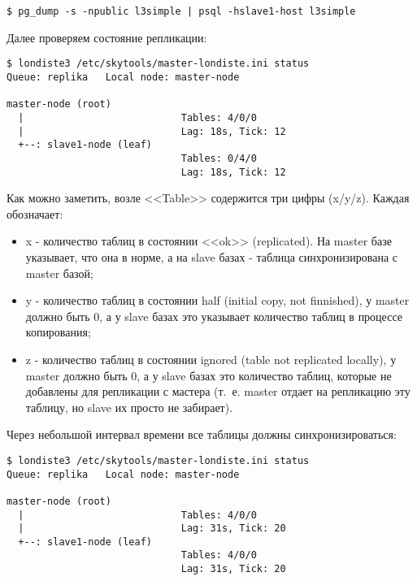 \begin{lstlisting}[label=lst:londiste-replica-dump1,caption=Клонирование структуры базы]
$ pg_dump -s -npublic l3simple | psql -hslave1-host l3simple
\end{lstlisting}

Далее проверяем состояние репликации:

\begin{lstlisting}[label=lst:londiste-replica15,caption=Статус кластера]
$ londiste3 /etc/skytools/master-londiste.ini status
Queue: replika   Local node: master-node

master-node (root)
  |                           Tables: 4/0/0
  |                           Lag: 18s, Tick: 12
  +--: slave1-node (leaf)
                              Tables: 0/4/0
                              Lag: 18s, Tick: 12
\end{lstlisting}

Как можно заметить, возле <<Table>> содержится три цифры (x/y/z). Каждая обозначает:

\begin{itemize}
  \item x - количество таблиц в состоянии <<ok>> (replicated). На master базе указывает, что она в норме, а на slave базах - таблица синхронизирована с master базой;
  \item y - количество таблиц в состоянии half (initial copy, not finnished), у master должно быть 0, а у slave базах это указывает количество таблиц в процессе копирования;
  \item z - количество таблиц в состоянии ignored (table not replicated locally), у master должно быть 0, а у slave базах это количество таблиц, которые не добавлены для репликации с мастера (т.~е. master отдает на репликацию эту таблицу, но slave их просто не забирает).
\end{itemize}

Через небольшой интервал времени все таблицы должны синхронизироваться:

\begin{lstlisting}[label=lst:londiste-replica16,caption=Статус кластера]
$ londiste3 /etc/skytools/master-londiste.ini status
Queue: replika   Local node: master-node

master-node (root)
  |                           Tables: 4/0/0
  |                           Lag: 31s, Tick: 20
  +--: slave1-node (leaf)
                              Tables: 4/0/0
                              Lag: 31s, Tick: 20
\end{lstlisting}

